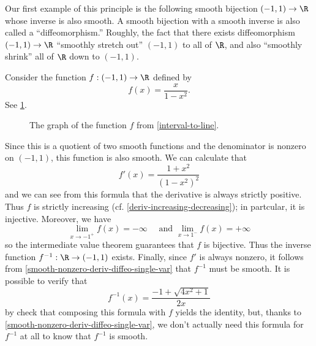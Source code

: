 Our first example of this principle is the following smooth bijection $(-1,1) \to \R$ whose inverse is also smooth. A smooth bijection with a smooth inverse is also called a ``diffeomorphism.'' Roughly, the fact that there exists diffeomorphism $(-1,1) \to \R$ ``smoothly stretch out'' $(-1,1)$ to all of $\R$, and also ``smoothly shrink'' all of $\R$ down to $(-1,1)$. 

\begin{example} \label{interval-to-line}
	Consider the function $f : (-1,1) \to \R$ defined by \[ f(x) = \frac{x}{1-x^2}. \]
	See \cref{interval-to-line-graph}. 
	\begin{figure}
		\begin{center}
		\end{center}
		\caption{The graph of the function $f$ from \cref{interval-to-line}.}  \label{interval-to-line-graph}
	\end{figure}
	Since this is a quotient of two smooth functions and the denominator is nonzero on $(-1,1)$, this function is also smooth. We can calculate that
	\[ f'(x) = \frac{1+x^2}{(1-x^2)^2} \]
	and we can see from this formula that the derivative is always strictly positive. Thus $f$ is strictly increasing (cf. \cref{deriv-increasing-decreasing}); in partcular, it is injective. Moreover, we have
	\[ \lim_{x \to -1^+} f(x) = -\infty \quad \text{ and } \lim_{x \to 1^-} f(x) = +\infty \]
	so the intermediate value theorem guarantees that $f$ is bijective. Thus the inverse function $f^{-1} : \R \to (-1,1)$ exists. Finally, since $f'$ is always nonzero, it follows from \cref{smooth-nonzero-deriv-diffeo-single-var} that $f^{-1}$ must be smooth. It is possible to verify that
	\[ f^{-1}(x) = \frac{-1+\sqrt{4x^2+1}}{2x} \]
	by check that composing this formula with $f$ yields the identity, but, thanks to \cref{smooth-nonzero-deriv-diffeo-single-var}, we don't actually need this formula for $f^{-1}$ at all to know that $f^{-1}$ is smooth.
\end{example}

